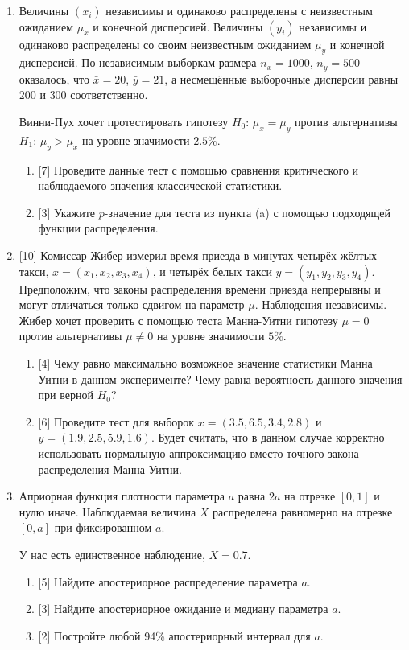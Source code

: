 \documentclass[12pt]{article}
\begin{document}
\begin{enumerate}
    \item Величины $(x_i)$ независимы и одинаково распределены с неизвестным ожиданием $\mu_x$ и конечной дисперсией.
    Величины $(y_i)$ независимы и одинаково распределены со своим неизвестным ожиданием $\mu_y$ и конечной дисперсией. 
    По независимым выборкам размера $n_x = 1000$, $n_y = 500$ оказалось, что $\bar x = 20$, $\bar y = 21$,
    а несмещённые выборочные дисперсии равны $200$ и $300$ соответственно. 

    Винни-Пух хочет протестировать гипотезу $H_0$: $\mu_x  = \mu_y$ против альтернативы $H_1$: $\mu_y > \mu_x$ на уровне значимости $2.5\%$.
    \begin{enumerate}
        \item {[7]} Проведите данные тест с помощью сравнения критического и наблюдаемого значения классической статистики. 
        \item {[3]} Укажите $p$-значение для теста из пункта (a) с помощью подходящей функции распределения.
    \end{enumerate}

    \item {[10]} Комиссар Жибер измерил время приезда в минутах четырёх жёлтых такси, $x = (x_1, x_2, x_3, x_4)$, и четырёх белых такси $y = (y_1, y_2, y_3, y_4)$.
    Предположим, что законы распределения времени приезда непрерывны и могут отличаться только сдвигом на параметр $\mu$. 
    Наблюдения независимы.  Жибер хочет проверить с помощью теста Манна-Уитни гипотезу $\mu = 0$ против альтернативы $\mu \neq 0$ на уровне значимости $5\%$.
    \begin{enumerate}
        \item {[4]} Чему равно максимально возможное значение статистики Манна Уитни в данном эксперименте? 
        Чему равна вероятность данного значения при верной $H_0$?
        \item {[6]} Проведите тест для выборок $x = (3.5, 6.5, 3.4, 2.8)$ и $y = (1.9, 2.5, 5.9, 1.6)$.
        Будет считать, что в данном случае корректно использовать нормальную аппроксимацию вместо точного закона распределения Манна-Уитни.
    \end{enumerate}
    
    
    

    \item Априорная функция плотности параметра $a$ равна $2a$ на отрезке $[0, 1]$ и нулю иначе.
    Наблюдаемая величина $X$ распределена равномерно на отрезке $[0, a]$ при фиксированном $a$.

    У нас есть единственное наблюдение, $X = 0.7$.

    \begin{enumerate}
        \item {[5]} Найдите апостериорное распределение параметра $a$. 
        \item {[3]} Найдите апостериорное ожидание и медиану параметра $a$. 
        \item {[2]} Постройте любой 94\% апостериорный интервал для $a$. 
    \end{enumerate}

\end{enumerate}
\end{document}
